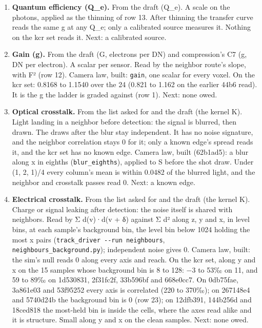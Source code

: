 \begin{enumerate}
\begin{itemize}
\item Prior art, cited from knowledge. The Fano factor of a thinned count, f′ − 1 = q(f − 1), from the photocount statistics of sub-Poisson light: L. Mandel, “Sub-Poissonian photon statistics in resonance fluorescence”, Opt. Lett. 4(7), 1979, 205–207.
\end{itemize}
\item \textbf{Quantum efficiency (Q\_\allowbreak{}e).} From the draft (Q\_\allowbreak{}e). A scale on the photons, applied as the thinning of row 13. After thinning the transfer curve reads the same g at any Q\_\allowbreak{}e; only a calibrated source measures it. Nothing on the kcr set reads it. Next: a calibrated source.
\item \textbf{Gain (g).} From the draft (G, electrons per DN) and compression's C7 (g, DN per electron). A scalar per sensor. Read by the neighbor route's slope, with F² (row 12). Camera law, built: \texttt{gain}, one scalar for every voxel. On the kcr set: 0.8168 to 1.1540 over the 24 (0.821 to 1.162 on the earlier 44b6 read). It is the g the ladder is graded against (row 1). Next: none owed.
\item \textbf{Optical crosstalk.} From the list asked for and the draft (the kernel K). Light landing in a neighbor before detection: the signal is blurred, then drawn. The draws after the blur stay independent. It has no noise signature, and the neighbor correlation stays 0 for it; only a known edge's spread reads it, and the kcr set has no known edge. Camera law, built (62b1ad5): a blur along x in eighths (\texttt{blur\_\allowbreak{}eighths}), applied to S before the shot draw. Under (1, 2, 1)/4 every column's mean is within 0.0482 of the blurred light, and the neighbor and crosstalk passes read 0. Next: a known edge.
\item \textbf{Electrical crosstalk.} From the list asked for and the draft (the kernel K). Charge or signal leaking after detection: the noise itself is shared with neighbors. Read by Σ d(v)·d(v + δ) against Σ d² along z, y and x, in level bins, at each sample's background bin, the level bin below 1024 holding the most x pairs (\texttt{track\_\allowbreak{}driver -\allowbreak{}-\allowbreak{}run neighbours}, \texttt{neighbours\_\allowbreak{}background.\allowbreak{}py}); independent noise gives 0. Camera law, built: the sim's null reads 0 along every axis and reach. On the kcr set, along y and x on the 15 samples whose background bin is 8 to 128: −3 to 53‰ on 11, and 59 to 89‰ on 1d530831, 2f31fc2f, 33b596bf and 668e0cc7. On 0db75fae, 3a861e03 and 53f95252 every axis is correlated (220 to 370‰); on 267148e4 and 5740d24b the background bin is 0 (row 23); on 12dfb391, 144b256d and 18ced818 the most-held bin is inside the cells, where the axes read alike and it is structure. Small along y and x on the clean samples. Next: none owed.

\end{enumerate}
